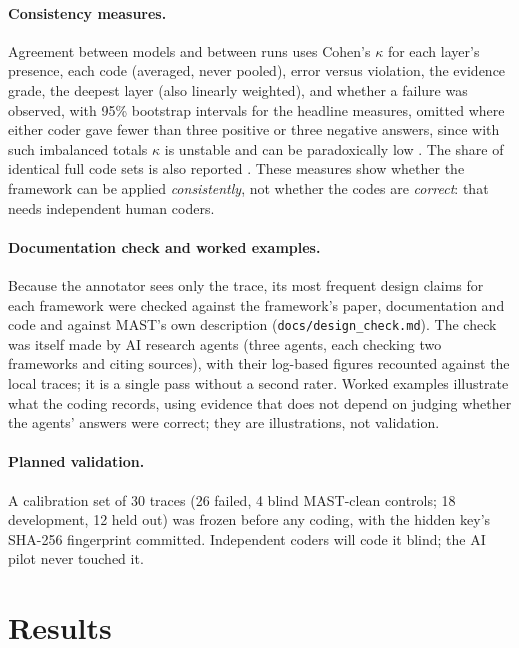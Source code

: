 \documentclass[10pt]{article}
\newcommand{\code}[1]{\texttt{#1}}
\begin{document}
\paragraph{Consistency measures.} Agreement between models and between runs uses
Cohen's $\kappa$ \citep{cohen1960kappa,landis1977measurement} for each layer's
presence, each code (averaged, never pooled), error versus violation, the evidence
grade, the deepest layer (also linearly weighted), and whether a failure was
observed, with 95\% bootstrap intervals for the headline measures, omitted where
either coder gave fewer than three positive or three negative answers, since with
such imbalanced totals $\kappa$ is unstable and can be paradoxically
low \citep{feinstein1990paradox}. The share of identical full code sets is
also reported \citep{ahmadi2025hfacsgrpo}. These measures show whether the
framework can be applied \emph{consistently}, not whether the codes are
\emph{correct}: that needs independent human coders.

\paragraph{Documentation check and worked examples.} Because the annotator sees only the trace, its most frequent design claims for each framework were checked against the framework's paper, documentation and code and against MAST's own description (\code{docs/design\_check.md}). The check was itself made by AI research agents (three agents, each checking two frameworks and citing sources), with their log-based figures recounted against the local traces; it is a single pass without a second rater. Worked examples illustrate what the
coding records, using evidence that does not depend on judging whether the agents'
answers were correct;
they are illustrations, not validation.

\paragraph{Planned validation.} A calibration set of 30 traces (26 failed, 4 blind
MAST-clean controls; 18 development, 12 held out) was frozen before any coding,
with the hidden key's SHA-256 fingerprint committed. Independent coders will code
it blind; the AI pilot never touched it.

\section{Results}
\label{sec:results}
\end{document}
